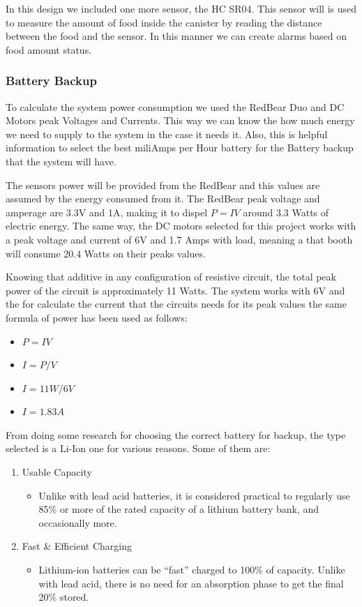 \documentclass[12pt]{article}
\begin{document}
In this design we included one more sensor, the HC SR04. This sensor will is used to measure the amount of food inside the canister by reading the distance between the food and the sensor. In this manner we can create alarms based on food amount status.

\subsubsection{Battery Backup}

To calculate the system power consumption we used the RedBear Duo and DC Motors peak Voltages and Currents. This way we can know the how much energy we need to supply to the system in the case it needs it. Also, this is helpful information to select the best miliAmps per Hour battery for the Battery backup that the system will have.

The sensors power will be provided from the RedBear and this values are assumed by the energy consumed from it. The RedBear peak voltage and amperage are 3.3V and 1A, making it to dispel \(P = IV\) around 3.3 Watts of electric energy. The same way, the DC motors selected for this project works with a peak voltage and current of 6V and 1.7 Amps with load, meaning a that booth will consume 20.4 Watts on their peaks values.

Knowing that additive in any configuration of resistive circuit, the total peak power of the circuit is approximately 11 Watts. The system works with 6V and the for calculate the current that the circuits needs for its peak values the same formula of power\cite{AllAboutCircuits} has been used as follows:

\begin{itemize}
  \item \(P = IV\)
  \item \(I = P/V\)
  \item \(I = 11W/6V\)
  \item \(I = 1.83A\)
\end{itemize}

From doing some research for choosing the correct battery for backup, the type selected is a Li-Ion one for various reasons. Some of them are:

\begin{enumerate}
  \item Usable Capacity

  \begin{itemize}
    \item Unlike with lead acid batteries, it is considered practical to regularly use 85\% or more of the rated capacity of a lithium battery bank, and occasionally more.
  \end{itemize}

  \item Fast \& Efficient Charging
  \begin{itemize}
    \item Lithium-ion batteries can be “fast” charged to 100\% of capacity. Unlike with lead acid, there is no need for an absorption phase to get the final 20\% stored.
  \end{itemize}
\end{enumerate}
\end{document}
